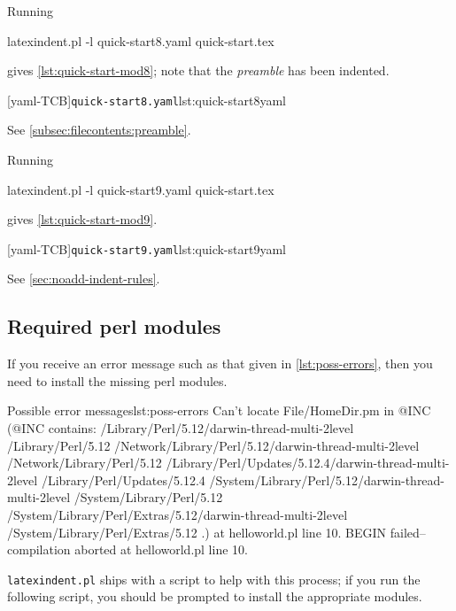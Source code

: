  \begin{example}
 Running

 \begin{commandshell}
latexindent.pl -l quick-start8.yaml quick-start.tex
\end{commandshell}

 gives \cref{lst:quick-start-mod8}; note that the \emph{preamble} has been indented.

 \begin{cmhtcbraster}
  [yaml-TCB]{\texttt{quick-start8.yaml}}{lst:quick-start8yaml}
 \end{cmhtcbraster}

 See \cref{subsec:filecontents:preamble}.

 \end{example}

 \begin{example}
 Running

 \begin{commandshell}
latexindent.pl -l quick-start9.yaml quick-start.tex
\end{commandshell}

 gives \cref{lst:quick-start-mod9}.

 \begin{cmhtcbraster}
  [yaml-TCB]{\texttt{quick-start9.yaml}}{lst:quick-start9yaml}
 \end{cmhtcbraster}

 See \cref{sec:noadd-indent-rules}.
 \end{example}

\subsection{Required perl modules}
 If you receive an error message such as that given in
 \cref{lst:poss-errors}, then you need to install the missing perl modules.
 \begin{cmhlistings}[style=tcblatex,language=Perl]{Possible error messages}{lst:poss-errors}
Can't locate File/HomeDir.pm in @INC (@INC contains: /Library/Perl/5.12/darwin-thread-multi-2level /Library/Perl/5.12 /Network/Library/Perl/5.12/darwin-thread-multi-2level /Network/Library/Perl/5.12 /Library/Perl/Updates/5.12.4/darwin-thread-multi-2level /Library/Perl/Updates/5.12.4 /System/Library/Perl/5.12/darwin-thread-multi-2level /System/Library/Perl/5.12 /System/Library/Perl/Extras/5.12/darwin-thread-multi-2level /System/Library/Perl/Extras/5.12 .) at helloworld.pl line 10.
BEGIN failed--compilation aborted at helloworld.pl line 10.
\end{cmhlistings}
 \texttt{latexindent.pl} ships with a script to help with this process; if you run the
 following script, you should be prompted to install the appropriate modules.

